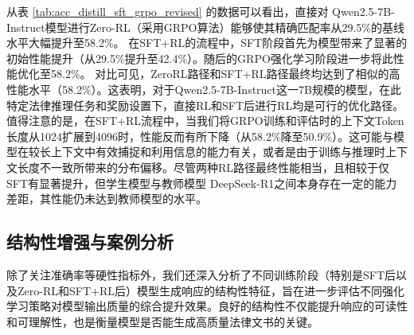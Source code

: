 \documentclass{pkuthesis}
\newcommand{\qwen}{Qwen2.5-7B-Instruct}
\newcommand{\deepseekr}{DeepSeek-R1}
\begin{document}
从表 \ref{tab:acc_distill_sft_grpo_revised} 的数据可以看出，直接对 \qwen 模型进行Zero-RL（采用GRPO算法）能够使其精确匹配率从29.5\%的基线水平大幅提升至58.2\%。
在SFT+RL的流程中，SFT阶段首先为模型带来了显著的初始性能提升（从29.5\%提升至42.4\%）。随后的GRPO强化学习阶段进一步将此性能优化至58.2\%。
对比可见，Zero\-RL路径和SFT+RL路径最终均达到了相似的高性能水平（58.2\%）。这表明，对于\qwen 这一7B规模的模型，在此特定法律推理任务和奖励设置下，直接RL和SFT后进行RL均是可行的优化路径。
值得注意的是，在SFT+RL流程中，当我们将GRPO训练和评估时的上下文Token长度从1024扩展到4096时，性能反而有所下降（从58.2\%降至50.9\%）。这可能与模型在较长上下文中有效捕捉和利用信息的能力有关，或者是由于训练与推理时上下文长度不一致所带来的分布偏移。尽管两种RL路径最终性能相当，且相较于仅SFT有显著提升，但学生模型与教师模型 \deepseekr 之间本身存在一定的能力差距，其性能仍未达到教师模型的水平。

\subsection{结构性增强与案例分析}
\label{sec:structural_enhancement_revised}
除了关注准确率等硬性指标外，我们还深入分析了不同训练阶段（特别是SFT后以及Zero-RL和SFT+RL后）模型生成响应的结构性特征，旨在进一步评估不同强化学习策略对模型输出质量的综合提升效果。良好的结构性不仅能提升响应的可读性和可理解性，也是衡量模型是否能生成高质量法律文书的关键。
\end{document}
